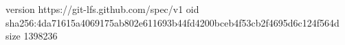 version https://git-lfs.github.com/spec/v1
oid sha256:4da71615a4069175ab802e611693b44fd4200bceb4f53cb2f4695d6c124f564d
size 1398236
